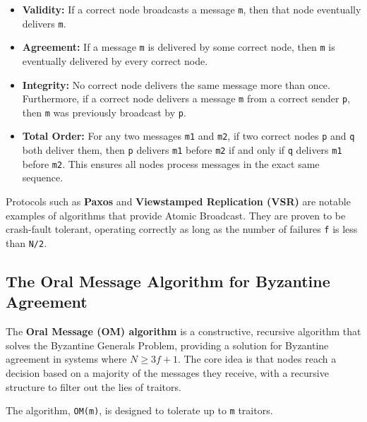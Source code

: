 \documentclass{scrbook}
\begin{document}
\begin{itemize}
\item
  \textbf{Validity:} If a correct node broadcasts a message \texttt{m},
  then that node eventually delivers \texttt{m}.
\item
  \textbf{Agreement:} If a message \texttt{m} is delivered by some
  correct node, then \texttt{m} is eventually delivered by every correct
  node.
\item
  \textbf{Integrity:} No correct node delivers the same message more
  than once. Furthermore, if a correct node delivers a message
  \texttt{m} from a correct sender \texttt{p}, then \texttt{m} was
  previously broadcast by \texttt{p}.
\item
  \textbf{Total Order:} For any two messages \texttt{m1} and
  \texttt{m2}, if two correct nodes \texttt{p} and \texttt{q} both
  deliver them, then \texttt{p} delivers \texttt{m1} before \texttt{m2}
  if and only if \texttt{q} delivers \texttt{m1} before \texttt{m2}.
  This ensures all nodes process messages in the exact same sequence.
\end{itemize}

Protocols such as \textbf{Paxos} and \textbf{Viewstamped Replication
(VSR)} are notable examples of algorithms that provide Atomic Broadcast.
They are proven to be crash-fault tolerant, operating correctly as long
as the number of failures \texttt{f} is less than \texttt{N/2}.

\subsection{The Oral Message Algorithm for Byzantine Agreement}

The \textbf{Oral Message (OM) algorithm} is a constructive, recursive
algorithm that solves the Byzantine Generals Problem, providing a
solution for Byzantine agreement in systems where
$N \geq 3f + 1$. The core idea is that nodes reach a decision
based on a majority of the messages they receive, with a recursive
structure to filter out the lies of traitors.

The algorithm, \texttt{OM(m)}, is designed to tolerate up to \texttt{m}
traitors.
\end{document}
